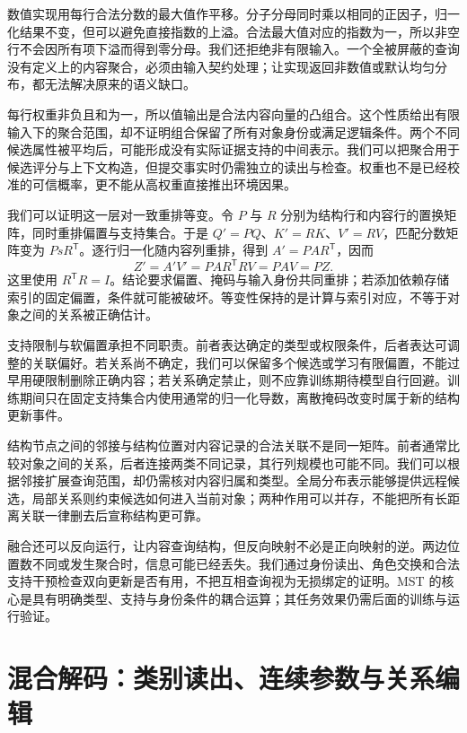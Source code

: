 数值实现用每行合法分数的最大值作平移。分子分母同时乘以相同的正因子，归一化结果不变，但可以避免直接指数的上溢。合法最大值对应的指数为一，所以非空行不会因所有项下溢而得到零分母。我们还拒绝非有限输入。一个全被屏蔽的查询没有定义上的内容聚合，必须由输入契约处理；让实现返回非数值或默认均匀分布，都无法解决原来的语义缺口。

每行权重非负且和为一，所以值输出是合法内容向量的凸组合。这个性质给出有限输入下的聚合范围，却不证明组合保留了所有对象身份或满足逻辑条件。两个不同候选属性被平均后，可能形成没有实际证据支持的中间表示。我们可以把聚合用于候选评分与上下文构造，但提交事实时仍需独立的读出与检查。权重也不是已经校准的可信概率，更不能从高权重直接推出环境因果。

我们可以证明这一层对一致重排等变。令 $P$ 与 $R$ 分别为结构行和内容行的置换矩阵，同时重排偏置与支持集合。于是 $Q'=PQ$、$K'=RK$、$V'=RV$，匹配分数矩阵变为 $P s R^{\mathsf T}$。逐行归一化随内容列重排，得到 $A'=PAR^{\mathsf T}$，因而
\begin{equation}
Z'=A'V'=PAR^{\mathsf T}RV=PAV=PZ.
\end{equation}
这里使用 $R^{\mathsf T}R=I$。结论要求偏置、掩码与输入身份共同重排；若添加依赖存储索引的固定偏置，条件就可能被破坏。等变性保持的是计算与索引对应，不等于对象之间的关系被正确估计。

支持限制与软偏置承担不同职责。前者表达确定的类型或权限条件，后者表达可调整的关联偏好。若关系尚不确定，我们可以保留多个候选或学习有限偏置，不能过早用硬限制删除正确内容；若关系确定禁止，则不应靠训练期待模型自行回避。训练期间只在固定支持集合内使用通常的归一化导数，离散掩码改变时属于新的结构更新事件。

结构节点之间的邻接与结构位置对内容记录的合法关联不是同一矩阵。前者通常比较对象之间的关系，后者连接两类不同记录，其行列规模也可能不同。我们可以根据邻接扩展查询范围，却仍需核对内容归属和类型。全局分布表示能够提供远程候选，局部关系则约束候选如何进入当前对象；两种作用可以并存，不能把所有长距离关联一律删去后宣称结构更可靠。

融合还可以反向运行，让内容查询结构，但反向映射不必是正向映射的逆。两边位置数不同或发生聚合时，信息可能已经丢失。我们通过身份读出、角色交换和合法支持干预检查双向更新是否有用，不把互相查询视为无损绑定的证明。MST 的核心是具有明确类型、支持与身份条件的耦合运算；其任务效果仍需后面的训练与运行验证。

\section{混合解码：类别读出、连续参数与关系编辑}
\label{sec:hybrid_decoder}

